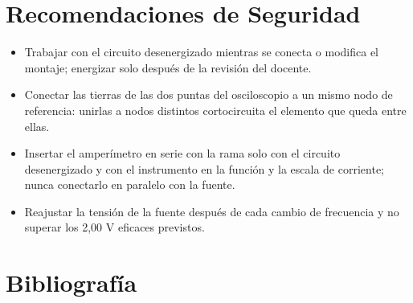 \documentclass[12pt]{article}
\begin{document}
\section{Recomendaciones de Seguridad}\label{sec:seguridad}
\begin{itemize}
  \item Trabajar con el circuito desenergizado mientras se conecta o modifica el montaje; energizar solo después de la revisión del docente.
  \item Conectar las tierras de las dos puntas del osciloscopio a un mismo nodo de referencia: unirlas a nodos distintos cortocircuita el elemento que queda entre ellas.
  \item Insertar el amperímetro en serie con la rama solo con el circuito desenergizado y con el instrumento en la función y la escala de corriente; nunca conectarlo en paralelo con la fuente.
  \item Reajustar la tensión de la fuente después de cada cambio de frecuencia y no superar los 2,00 V eficaces previstos.
\end{itemize}

\section{Bibliografía}\label{sec:bibliografia}
\nocite{*}
\bibliografia
\end{document}
